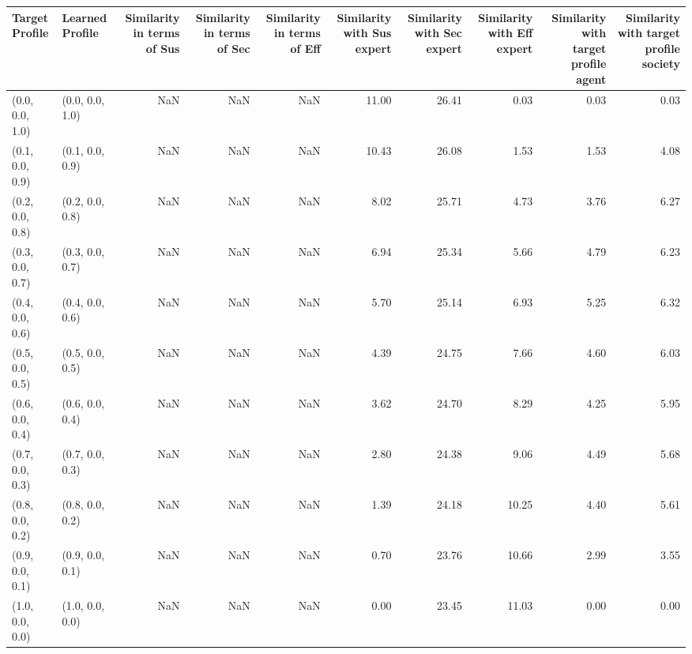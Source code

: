 \begin{tabular}{llrrrrrrrr}
\toprule
Target Profile & Learned Profile & Similarity in terms of Sus & Similarity in terms of Sec & Similarity in terms of Eff & Similarity with Sus expert & Similarity with Sec expert & Similarity with Eff expert & Similarity with target profile agent & Similarity with target profile society \\
\midrule
(0.0, 0.0, 1.0) & (0.0, 0.0, 1.0) & NaN & NaN & NaN & 11.00 & 26.41 & 0.03 & 0.03 & 0.03 \\
(0.1, 0.0, 0.9) & (0.1, 0.0, 0.9) & NaN & NaN & NaN & 10.43 & 26.08 & 1.53 & 1.53 & 4.08 \\
(0.2, 0.0, 0.8) & (0.2, 0.0, 0.8) & NaN & NaN & NaN & 8.02 & 25.71 & 4.73 & 3.76 & 6.27 \\
(0.3, 0.0, 0.7) & (0.3, 0.0, 0.7) & NaN & NaN & NaN & 6.94 & 25.34 & 5.66 & 4.79 & 6.23 \\
(0.4, 0.0, 0.6) & (0.4, 0.0, 0.6) & NaN & NaN & NaN & 5.70 & 25.14 & 6.93 & 5.25 & 6.32 \\
(0.5, 0.0, 0.5) & (0.5, 0.0, 0.5) & NaN & NaN & NaN & 4.39 & 24.75 & 7.66 & 4.60 & 6.03 \\
(0.6, 0.0, 0.4) & (0.6, 0.0, 0.4) & NaN & NaN & NaN & 3.62 & 24.70 & 8.29 & 4.25 & 5.95 \\
(0.7, 0.0, 0.3) & (0.7, 0.0, 0.3) & NaN & NaN & NaN & 2.80 & 24.38 & 9.06 & 4.49 & 5.68 \\
(0.8, 0.0, 0.2) & (0.8, 0.0, 0.2) & NaN & NaN & NaN & 1.39 & 24.18 & 10.25 & 4.40 & 5.61 \\
(0.9, 0.0, 0.1) & (0.9, 0.0, 0.1) & NaN & NaN & NaN & 0.70 & 23.76 & 10.66 & 2.99 & 3.55 \\
(1.0, 0.0, 0.0) & (1.0, 0.0, 0.0) & NaN & NaN & NaN & 0.00 & 23.45 & 11.03 & 0.00 & 0.00 \\
\bottomrule
\end{tabular}
